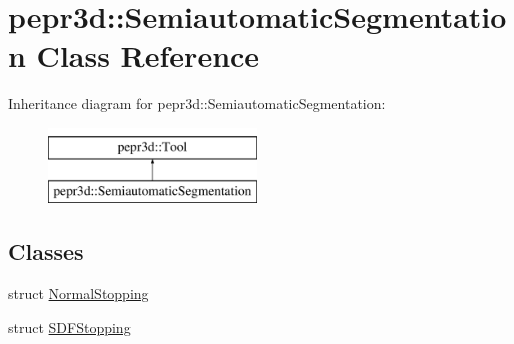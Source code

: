 \hypertarget{classpepr3d_1_1_semiautomatic_segmentation}{}\section{pepr3d\+::Semiautomatic\+Segmentation Class Reference}
\label{classpepr3d_1_1_semiautomatic_segmentation}
Inheritance diagram for pepr3d\+::Semiautomatic\+Segmentation\+:\begin{figure}[H]
\begin{center}
\leavevmode
\includegraphics[height=2.000000cm]{classpepr3d_1_1_semiautomatic_segmentation}
\end{center}
\end{figure}
\subsection*{Classes}
\begin{DoxyCompactItemize}
\item 
struct \mbox{\hyperlink{structpepr3d_1_1_semiautomatic_segmentation_1_1_normal_stopping}{Normal\+Stopping}}
\item 
struct \mbox{\hyperlink{structpepr3d_1_1_semiautomatic_segmentation_1_1_s_d_f_stopping}{S\+D\+F\+Stopping}}
\end{DoxyCompactItemize}
